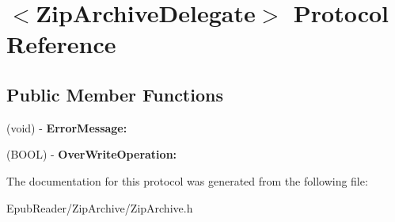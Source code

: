 \hypertarget{protocol_zip_archive_delegate-p}{\section{$<$Zip\-Archive\-Delegate$>$ Protocol Reference}
\label{protocol_zip_archive_delegate-p}
}
\subsection*{Public Member Functions}
\begin{DoxyCompactItemize}
\item 
\hypertarget{protocol_zip_archive_delegate-p_aa3d161ac9ca24493b6c4bf0d2dbf9459}{(void) -\/ {\bfseries Error\-Message\-:}}\label{protocol_zip_archive_delegate-p_aa3d161ac9ca24493b6c4bf0d2dbf9459}

\item 
\hypertarget{protocol_zip_archive_delegate-p_a2e45500c825406a69694c2d3b86fa876}{(B\-O\-O\-L) -\/ {\bfseries Over\-Write\-Operation\-:}}\label{protocol_zip_archive_delegate-p_a2e45500c825406a69694c2d3b86fa876}

\end{DoxyCompactItemize}


The documentation for this protocol was generated from the following file\-:\begin{DoxyCompactItemize}
\item 
Epub\-Reader/\-Zip\-Archive/Zip\-Archive.\-h\end{DoxyCompactItemize}
